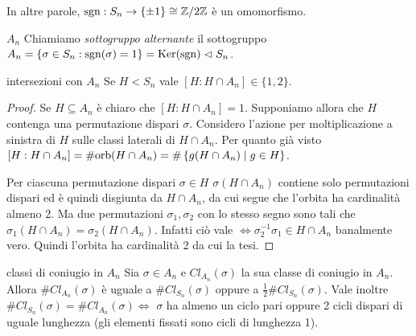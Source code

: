     In altre parole, $\text{sgn}: S_n \rightarrow \left\{ \pm 1 \right\} \cong \mathbb{Z}/2\mathbb{Z}$ è un omomorfismo.
\begin{definition}{$A_n$}
    Chiamiamo \emph{sottogruppo alternante} il sottogruppo $A_n = \{\sigma \in S_n : \text{sgn} (\sigma) = 1\} = \text{Ker}(\text{sgn}) \vartriangleleft S_n$.
\end{definition}
\begin{proposition}{intersezioni con $A_n$}
    Se $H < S_n$ vale $[H : H \cap A_n] \in \{1, 2\}$.
\end{proposition}
\begin{proof}
    Se $H \subseteq A_n$ è chiaro che $[H : H \cap A_n] = 1$. Supponiamo allora che $H$ contenga una permutazione dispari $\sigma$. 
    Considero l'azione per moltiplicazione a sinistra di $H$ sulle classi laterali di $H \cap A_n$. Per quanto già visto $[H : H \cap A_n] = \#\text{orb}(H \cap A_n) = \#\left\{ g(H \cap A_n)  \mid  g \in H \right\}$.

    Per ciascuna permutazione dispari $\sigma \in H$ $\sigma(H \cap A_n)$ contiene solo permutazioni dispari ed è quindi disgiunta da $H \cap A_n$, da cui segue che l'orbita ha cardinalità almeno 2. Ma due permutazioni $\sigma_1,\sigma_2$ con lo stesso segno sono tali che $\sigma_1(H \cap A_n) = \sigma_2(H \cap A_n)$. Infatti ciò vale $\iff \sigma_2^{-1}\sigma_1 \in H \cap A_n$ banalmente vero. Quindi l'orbita ha cardinalità 2 da cui la tesi.
\end{proof}
\begin{proposition}{classi di coniugio in $A_n$}
    Sia $\sigma \in A_n$ e $Cl_{A_n}(\sigma)$ la sua classe di coniugio in $A_n$. Allora $\#Cl_{A_n}(\sigma)$ è uguale a $\#Cl_{S_n}(\sigma)$ oppure a $\frac{1}{2}\#Cl_{S_n}(\sigma)$. Vale inoltre $\#Cl_{S_n}(\sigma) = \#Cl_{A_n}(\sigma) \iff$ $\sigma$ ha almeno un ciclo pari oppure 2 cicli dispari di uguale lunghezza (gli elementi fissati sono cicli di lunghezza 1).
\end{proposition}
